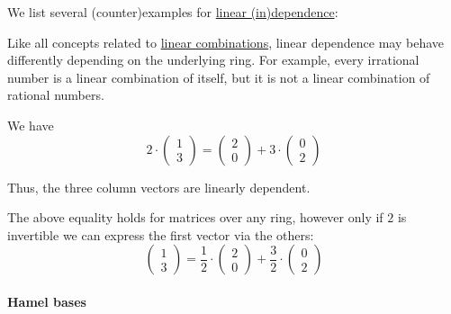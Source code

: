 \begin{example}\label{ex:def:linear_dependence}
  We list several (counter)examples for \hyperref[def:linear_dependence]{linear (in)dependence}:
  \begin{thmenum}
     Like all concepts related to \hyperref[def:linear_combination]{linear combinations}, linear dependence may behave differently depending on the underlying ring. For example, every irrational number is a linear combination of itself, but it is not a linear combination of rational numbers.

     We have
    \begin{equation*}
      2 \cdot
      \begin{pmatrix}
        1 \\ 3
      \end{pmatrix}
      =
      \begin{pmatrix}
        2 \\ 0
      \end{pmatrix}
      +
      3 \cdot
      \begin{pmatrix}
        0 \\ 2
      \end{pmatrix}
    \end{equation*}

    Thus, the three column vectors are linearly dependent.

    The above equality holds for matrices over any ring, however only if \( 2 \) is invertible we can express the first vector via the others:
    \begin{equation*}
      \begin{pmatrix}
        1 \\ 3
      \end{pmatrix}
      =
      \frac 1 2 \cdot
      \begin{pmatrix}
        2 \\ 0
      \end{pmatrix}
      +
      \frac 3 2 \cdot
      \begin{pmatrix}
        0 \\ 2
      \end{pmatrix}
    \end{equation*}
  \end{thmenum}
\end{example}

\paragraph{Hamel bases}

